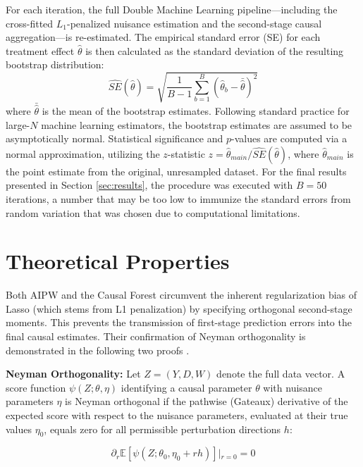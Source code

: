 \documentclass[12pt, a4paper]{article}
\begin{document}
For each iteration, the full Double Machine Learning pipeline—including the cross-fitted $L_1$-penalized nuisance estimation and the second-stage causal aggregation—is re-estimated. The empirical standard error (SE) for each treatment effect $\hat{\theta}$ is then calculated as the standard deviation of the resulting bootstrap distribution:
\begin{equation}
    \widehat{SE}(\hat{\theta}) = \sqrt{\frac{1}{B-1} \sum_{b=1}^{B} \left( \hat{\theta}_b - \bar{\hat{\theta}} \right)^2}
\end{equation}
where $\bar{\hat{\theta}}$ is the mean of the bootstrap estimates. Following standard practice for large-$N$ machine learning estimators, the bootstrap estimates are assumed to be asymptotically normal. Statistical significance and $p$-values are computed via a normal approximation, utilizing the $z$-statistic $z = \hat{\theta}_{main} / \widehat{SE}(\hat{\theta})$, where $\hat{\theta}_{main}$ is the point estimate from the original, unresampled dataset. For the final results presented in Section \ref{sec:results}, the procedure was executed with $B = 50$ iterations, a number that may be too low to immunize the standard errors from random variation that was chosen due to computational limitations.


\section{Theoretical Properties}
\label{sec:theoretical_properties}

Both AIPW and the Causal Forest circumvent the inherent regularization bias of Lasso (which stems from L1 penalization) by specifying orthogonal second-stage moments. This prevents the transmission of first-stage prediction errors into the final causal estimates. Their confirmation of Neyman orthogonality is demonstrated in the following two proofs \citep[Based on][]{CausalMLBookAppliedCausal}.

\begin{theorem}\label{the:Neyman_orthogonality_pathwise}
\textbf{Neyman Orthogonality: } Let $Z = (Y, D, W)$ denote the full data vector. A score function $\psi(Z; \theta, \eta)$ identifying a causal parameter $\theta$ with nuisance parameters $\eta$ is Neyman orthogonal if the pathwise (Gateaux) derivative of the expected score with respect to the nuisance parameters, evaluated at their true values $\eta_0$, equals zero for all permissible perturbation directions $h$:


$$\partial_r \mathbb{E}[\psi(Z; \theta_0, \eta_0 + r h)] \Big\vert{}_{r = 0} = 0$$


\end{theorem}
\end{document}

